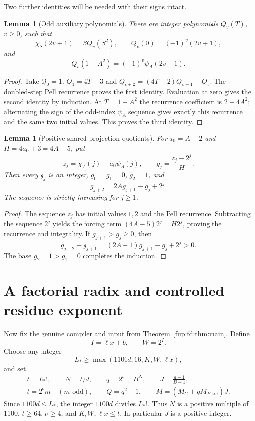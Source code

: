 \documentclass[11pt,letterpaper]{article}
\newtheorem{lemma}[theorem]{Lemma}
\theoremstyle{definition}\newtheorem{definition}[theorem]{Definition}
\theoremstyle{remark}\newtheorem{remark}[theorem]{Remark}
\newcommand{\MC}{M_C}
\newcommand{\MFsrcV}{M_{F,\mathrm{src}}}
\begin{document}
Two further identities will be needed with their signs intact.
\begin{lemma}[Odd auxiliary polynomials]\label{fup:fd:lem:oddpoly}
There are integer polynomials $Q_v(T)$, $v\ge0$, such that
\[
 \chi_S(2v+1)=S Q_v(S^2),\qquad
 Q_v(0)=(-1)^v(2v+1),
\]
and
\[
 Q_v(1-A^2)=(-1)^v\psi_A(2v+1).
\]
\end{lemma}
\begin{proof}
Take $Q_0=1$, $Q_1=4T-3$ and
$Q_{v+2}=(4T-2)Q_{v+1}-Q_v$. The doubled-step Pell recurrence proves the first identity. Evaluation at zero gives the second identity by induction. At $T=1-A^2$ the recurrence coefficient is $2-4A^2$; alternating the sign of the odd-index $\psi_A$ sequence gives exactly this recurrence and the same two initial values. This proves the third identity.
\end{proof}

\begin{lemma}[Positive shared projection quotients]\label{fup:fd:lem:g}
For $a_0=A-2$ and $H=4a_0+3=4A-5$, put
\[
 z_j=\chi_A(j)-a_0\psi_A(j),\qquad
 g_j=\frac{z_j-2^j}{H}.
\]
Then every $g_j$ is an integer, $g_0=g_1=0$, $g_2=1$, and
\begin{equation}\label{fup:fd:eq:grecurrence}
 g_{j+2}=2Ag_{j+1}-g_j+2^j.
\end{equation}
The sequence is strictly increasing for $j\ge1$.
\end{lemma}
\begin{proof}
The sequence $z_j$ has initial values $1,2$ and the Pell recurrence. Subtracting the sequence $2^j$ yields the forcing term $(4A-5)2^j=H2^j$, proving the recurrence and integrality. If $g_{j+1}>g_j\ge0$, then
\[
 g_{j+2}-g_{j+1}=(2A-1)g_{j+1}-g_j+2^j>0.
\]
The base $g_2=1>g_1=0$ completes the induction.
\end{proof}

\section{A factorial radix and controlled residue exponent}\label{fup:fd:sec:factorial}
Now fix the genuine compiler and input from Theorem~\ref{fup:fd:thm:main}. Define
\[
 I=\ell x+b,\qquad W=2^I.
\]
Choose any integer
\begin{equation}\label{fup:fd:eq:Lchoice}
 L_*\ge\max(1100d,16,K,W,\ell x),
\end{equation}
and set
\begin{equation}\label{fup:fd:eq:radix}
 \begin{gathered}
 t=L_*!,\qquad N=t/d,\qquad q=2^t=B^N,
 \qquad J=\frac{q-1}{B-1},\\
 t=2^\nu m\quad(m\text{ odd}),\qquad
 Q=q^2-1,\qquad M=(\MC+q\MFsrcV)J.
 \end{gathered}
\end{equation}
Since $1100d\le L_*$, the integer $1100d$ divides $L_*!$. Thus $N$ is a positive multiple of 1100, $t\ge64$, $\nu\ge4$, and $K,W,\ell x\le t$. In particular $J$ is a positive integer.
\end{document}
